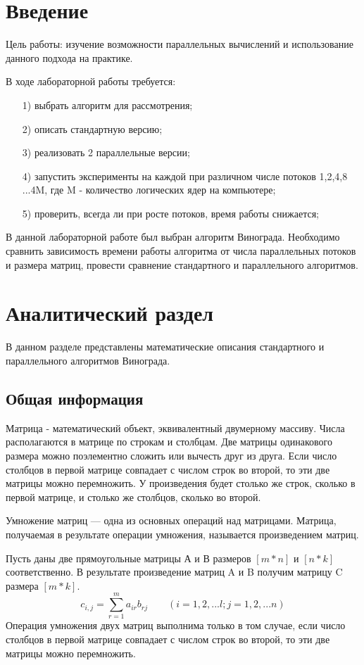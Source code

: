 \documentclass[14pt, a4paper]{extarticle}
\begin{document}
	\section*{Введение}
	Цель работы: изучение возможности параллельных вычислений и использование данного подхода на практике.\par
	В ходе лабораторной работы требуется:
	\begin{enumerate}
		\item[1)] выбрать алгоритм для рассмотрения;
		\item[2)] описать стандартную версию;
		\item[3)] реализовать 2 параллельные версии;
		\item[4)] запустить эксперименты на каждой при различном числе потоков 1,2,4,8 ...4M, где M - количество логических ядер на компьютере;
		\item[5)] проверить, всегда ли при росте потоков, время работы снижается;
	\end{enumerate}
	В данной лабораторной работе был выбран алгоритм Винограда. Необходимо сравнить зависимость времени работы алгоритма от числа параллельных потоков и размера матриц, провести сравнение стандартного и параллельного алгоритмов.

	\clearpage
	\section{Аналитический раздел}
	В данном разделе представлены математические описания стандартного и параллельного алгоритмов Винограда.
	
	\subsection{Общая информация}
	Матрица - математический объект, эквивалентный двумерному массиву. Числа располагаются в матрице по строкам и столбцам. Две матрицы одинакового размера можно поэлементно сложить или вычесть друг из друга. Если число столбцов в первой матрице совпадает с числом строк во второй, то эти две матрицы можно перемножить. У произведения будет столько же строк, сколько в первой матрице, и столько же столбцов, сколько во второй.
	
	Умножение матриц — одна из основных операций над матрицами. Матрица, получаемая в результате операции умножения, называется произведением матриц.
	
	Пусть даны две прямоугольные матрицы А и В размеров $[m * n]$ и $[n * k]$ соответственно.  
	В результате произведение матриц A и B получим матрицу C размера $[m *  k]$.
	\begin{equation}
		c_{i,j} = \sum_{r=1}^{m}a_{ir}b_{rj} \qquad (i=1,2,...l; j = 1,2,...n)
	\end{equation}
	Операция умножения двух матриц выполнима только в том случае, если число столбцов в первой матрице совпадает с числом строк во второй, то эти две матрицы можно перемножить.
	
\end{document}
